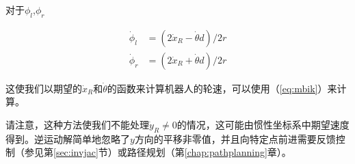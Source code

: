 对于$\phi_l$,$\phi_r$

\begin{eqnarray}
\dot{\phi}_l &= (2\dot{x}_R - \dot{\theta}d)/2r\\
\nonumber
\dot{\phi}_r &= (2\dot{x}_R + \dot{\theta}d)/2r
\end{eqnarray}



这使我们以期望的$\dot{x}_R$和$\dot{\theta}$的函数来计算机器人的轮速，可以使用（\ref{eq:mbik}）来计算。

请注意，这种方法使我们不能处理$\dot{y}_R\neq 0$的情况，这可能由惯性坐标系中期望速度得到。逆运动解简单地忽略了$y$方向的平移非零值，并且向特定点前进需要反馈控制（参见第\ref{sec:invjac}节）或路径规划（第\ref{chap:pathplanning}章）。



